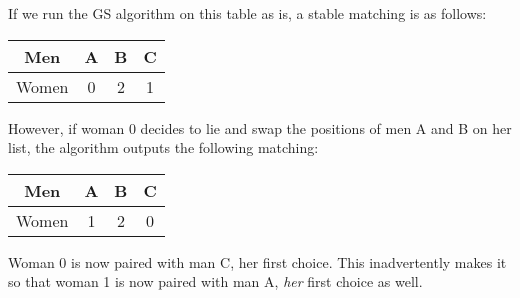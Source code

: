 \documentclass[12pt]{article}
\begin{document}
If we run the GS algorithm on this table as is, a stable matching is as follows:

\begin{table}[H]
    \centering
    \begin{tabular}{|c|c|c|c|}
        \hline
        Men & A & B & C \\
        \hline
        Women & 0 & 2 & 1 \\
        \hline

    \end{tabular}
\end{table}

However, if woman 0 decides to lie and swap the positions of men A and B on her list,
the algorithm outputs the following matching:

\begin{table}[H]
    \centering
    \begin{tabular}{|c|c|c|c|}
        \hline
        Men & A & B & C \\
        \hline
        Women & 1 & 2 & 0 \\
        \hline
    \end{tabular}
\end{table}

Woman 0 is now paired with man C, her first choice.
This inadvertently makes it so that woman 1 is now paired with man A,
\textit{her} first choice as well.
\end{document}
